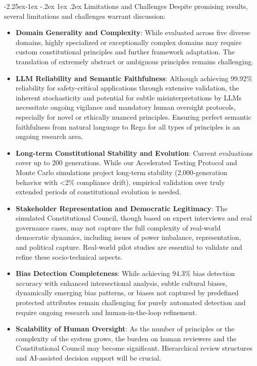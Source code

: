 \documentclass[manuscript,screen,review,anonymous,9pt]{acmart}
\makeatletter
\renewcommand\subsection{\@startsection{subsection}{2}{\z@}%
  {-2.25ex\@plus -1ex \@minus -.2ex}%
  {1ex \@plus .2ex}%
  {\normalfont\large\bfseries}}
\makeatother
\begin{document}
\subsection{Limitations and Challenges}
\label{subsec:challenges_limitations_merged}
Despite promising results, several limitations and challenges warrant discussion:
\begin{itemize}[leftmargin=*,itemsep=1pt,parsep=1pt]
    \item \textbf{Domain Generality and Complexity}: While evaluated across five diverse domains, highly specialized or exceptionally complex domains may require custom constitutional principles and further framework adaptation. The translation of extremely abstract or ambiguous principles remains challenging.
    \item \textbf{LLM Reliability and Semantic Faithfulness}: Although achieving 99.92\% reliability for safety-critical applications through extensive validation, the inherent stochasticity and potential for subtle misinterpretations by LLMs necessitate ongoing vigilance and mandatory human oversight protocols, especially for novel or ethically nuanced principles. Ensuring perfect semantic faithfulness from natural language to Rego for all types of principles is an ongoing research area.
    \item \textbf{Long-term Constitutional Stability and Evolution}: Current evaluations cover up to 200 generations. While our Accelerated Testing Protocol and Monte Carlo simulations project long-term stability (2,000-generation behavior with <2\% compliance drift), empirical validation over truly extended periods of constitutional evolution is needed.
    \item \textbf{Stakeholder Representation and Democratic Legitimacy}: The simulated Constitutional Council, though based on expert interviews and real governance cases, may not capture the full complexity of real-world democratic dynamics, including issues of power imbalance, representation, and political capture. Real-world pilot studies are essential to validate and refine these socio-technical aspects.
    \item \textbf{Bias Detection Completeness}: While achieving 94.3\% bias detection accuracy with enhanced intersectional analysis, subtle cultural biases, dynamically emerging bias patterns, or biases not captured by predefined protected attributes remain challenging for purely automated detection and require ongoing research and human-in-the-loop refinement.
    \item \textbf{Scalability of Human Oversight}: As the number of principles or the complexity of the system grows, the burden on human reviewers and the Constitutional Council may become significant. Hierarchical review structures and AI-assisted decision support will be crucial.
\end{itemize}
\end{document}
